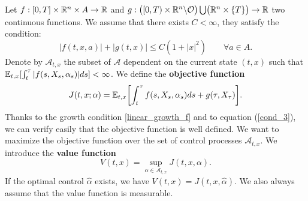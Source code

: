 \noindent
Let $f:[0,T]\times \mathbb{R}^n \times A \to \mathbb{R}$ and $g: \bigl( [0,T)\times \mathbb{R}^n \backslash \mathcal{O} \bigr) \bigcup \bigl( \mathbb{R}^n \times \{T\} \bigr) \to \mathbb{R}$ two continuous functions. 
We assume that there exists $C < \infty$, they satisfy the condition:
 \begin{equation}\label{linear_growth_f}
  |f(t,x,a)| + |g(t,x)| \leq C (1+|x|^2) \quad \quad \forall a \in A.
 \end{equation}
Denote by $\mathcal{A}_{t,x}$ the subset of $\mathcal{A}$ dependent on the current state $(t,x)$ such that $\mathbb{E}_{t,x} [\int_{t}^{\tau} |f(s,X_s,\alpha_s)| ds] < \infty $. 
We define the \textbf{objective function}
\begin{equation}\label{cost_functional}
 J(t,x;\alpha) = \mathbb{E}_{t,x} \biggl[ \int_t^{\tau} f(s,X_s,\alpha_s) ds + g(\tau, X_{\tau}) \biggr] . 
\end{equation}
Thanks to the growth condition \ref{linear_growth_f} and to equation (\ref{cond_3}), we can verify easily that the objective function is well defined. 
We want to maximize the objective function over the set of control processes $\mathcal{A}_{t,x}$. We introduce the \textbf{value function}
\begin{equation}\label{general_value_function}
 V(t,x) = \sup_{\alpha \in \mathcal{A}_{t,x}} J(t,x,\alpha).
\end{equation}
If the optimal control $\hat \alpha$ exists, we have $V(t,x) = J(t,x,\hat \alpha)$.
We also always assume that the value function is 
measurable.
\newline

